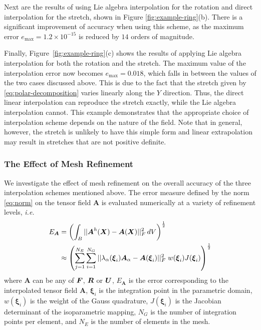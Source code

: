 \documentclass[12pt]{article}
\newcommand{\mbs}[1]{\boldsymbol{#1}}
\def\bA{{\mbs{A}}} \def\bB{{\mbs{B}}} \def\bC{{\mbs{C}}}
\def\bxi{{\mbs{\xi}}}
\begin{document}
Next are the results of using Lie algebra interpolation for the rotation and
direct interpolation for the stretch, shown in Figure \ref{fig:example-ring}(b).
There is a significant improvement of accuracy when using this scheme, as the
maximum error $e_{\text{max}} = 1.2 \times 10^{-15}$ is reduced by $14$ orders
of magnitude.

Finally, Figure~\ref{fig:example-ring}(c) shows the results of applying Lie
algebra interpolation for both the rotation and the stretch. The maximum value
of the interpolation error now becomes $e_{\text{max}} = 0.018$, which falls in
between the values of the two cases discussed above. This is due to the fact
that the stretch given by \eqref{eq:polar-decomposition} varies linearly along
the $Y$ direction. Thus, the direct linear interpolation can reproduce the
stretch exactly, while the Lie algebra interpolation cannot. This example
demonstrates that the appropriate choice of interpolation scheme depends on the
nature of the field. Note that in general, however, the stretch is unlikely to
have this simple form and linear extrapolation may result in stretches that are
not positive definite.

\subsubsection{The Effect of Mesh Refinement}

We investigate the effect of mesh refinement on the overall accuracy of the
three interpolation schemes mentioned above. The error measure defined by the
norm \eqref{eq:norm} on the tensor field $\bA$ is evaluated numerically at a
variety of refinement levels, \emph{i.e.}
\begin{align}
  E_{\bA} & =
  \left(
    \int_{B} || \bA^{h}(\bX)- \bA(\bX) ||^2_{F} \, dV
  \right)^{\frac{1}{2}} \nonumber
  \\
  & \approx
  \left(
    \sum^{N_E}_{j=1}\sum^{N_G}_{i=1}
    || \lambda_{\alpha} (\bxi_{i}) \bA_{\alpha} - \bA(\bxi_{i}) ||^2_{F} \;
    w(\bxi_{i})  J(\bxi_{i})
  \right)^{\frac{1}{2}}
  \label{eq:Frobenius-norm-global}
\end{align}
where $\bA$ can be any of $\bF$, $\bR$ or $\bU$, $E_{\bA}$ is the error
corresponding to the interpolated tensor field $\bA$, $\bxi_i$ is the
integration point in the parametric domain, $w(\bxi_i)$ is the weight of
the Gauss quadrature, $J(\bxi_i)$ is the Jacobian determinant of the
isoparametric mapping, $N_G$ is the number of integration points per
element, and $N_E$ is the number of elements in the mesh.
\end{document}
